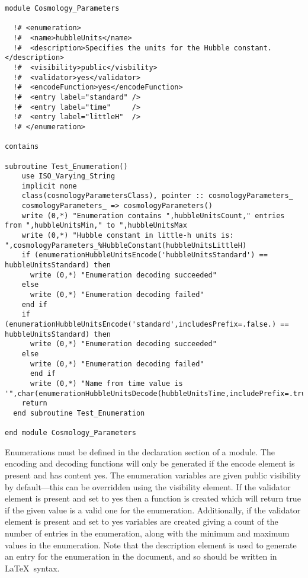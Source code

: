 \begin{lstlisting}
module Cosmology_Parameters

  !# <enumeration>
  !#  <name>hubbleUnits</name>
  !#  <description>Specifies the units for the Hubble constant.</description>
  !#  <visibility>public</visbility>
  !#  <validator>yes</validator>
  !#  <encodeFunction>yes</encodeFunction>
  !#  <entry label="standard" />
  !#  <entry label="time"     />
  !#  <entry label="littleH"  />
  !# </enumeration>

contains

subroutine Test_Enumeration()
    use ISO_Varying_String
    implicit none
    class(cosmologyParametersClass), pointer :: cosmologyParameters_
    cosmologyParameters_ => cosmologyParameters()
    write (0,*) "Enumeration contains ",hubbleUnitsCount," entries from ",hubbleUnitsMin," to ",hubbleUnitsMax
    write (0,*) "Hubble constant in little-h units is: ",cosmologyParameters_%HubbleConstant(hubbleUnitsLittleH)
    if (enumerationHubbleUnitsEncode('hubbleUnitsStandard') == hubbleUnitsStandard) then
      write (0,*) "Enumeration decoding succeeded"
    else
      write (0,*) "Enumeration decoding failed"
    end if
    if (enumerationHubbleUnitsEncode('standard',includesPrefix=.false.) == hubbleUnitsStandard) then
      write (0,*) "Enumeration decoding succeeded"
    else
      write (0,*) "Enumeration decoding failed"
      end if
      write (0,*) "Name from time value is '",char(enumerationHubbleUnitsDecode(hubbleUnitsTime,includePrefix=.true.)),"'"
    return
  end subroutine Test_Enumeration

end module Cosmology_Parameters
\end{lstlisting}

Enumerations must be defined in the declaration section of a {\normalfont \ttfamily module}. The encoding and decoding functions will only be generated if the {\normalfont \ttfamily encode} element is present and has content {\normalfont \ttfamily yes}. The enumeration variables are given {\normalfont \ttfamily public} visibility by default---this can be overridden using the {\normalfont \ttfamily visibility} element. If the {\normalfont \ttfamily validator} element is present and set to {\normalfont \ttfamily yes} then a function is created which will return true if the given value is a valid one for the enumeration. Additionally, if the {\normalfont \ttfamily validator} element is present and set to {\normalfont \ttfamily yes} variables are created giving a count of the number of entries in the enumeration, along with the minimum and maximum values in the enumeration. Note that the {\normalfont \ttfamily description} element is used to generate an entry for the enumeration in the document, and so should be written in \LaTeX\ syntax.


